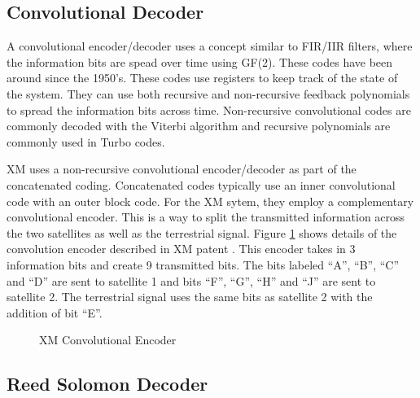 \documentclass[conference,onecolumn]{IEEEtran}
\begin{document}
\subsection{Convolutional Decoder}

A convolutional encoder/decoder uses a concept similar to FIR/IIR filters, where the information bits are spead over time using GF(2).  These codes have been around since the 1950's.  These codes use registers to keep track of the state of the system.  They can use both recursive and non-recursive feedback polynomials to spread the information bits across time.  Non-recursive convolutional codes are commonly decoded with the Viterbi algorithm and recursive polynomials are commonly used in Turbo codes.

XM uses a non-recursive convolutional encoder/decoder as part of the concatenated coding.  Concatenated codes typically use an inner convolutional code with an outer block code.  For the XM sytem, they employ a complementary convolutional encoder.  This is a way to split the transmitted information across the two satellites as well as the terrestrial signal.  Figure \ref{fig::Viterbi} shows details of the convolution encoder described in XM patent \cite{marko_2012_us8667344b2}.  This encoder takes in 3 information bits and create 9 transmitted bits.  The bits labeled ``A'', ``B'', ``C'' and ``D'' are sent to satellite 1 and bits ``F'', ``G'', ``H'' and ``J'' are sent to satellite 2.  The terrestrial signal uses the same bits as satellite 2 with the addition of bit ``E''.

\begin{figure}[H]
	\centerline{}
	\caption{XM Convolutional Encoder \cite{marko_2012_us8667344b2}}
	\label{fig::Viterbi}
\end{figure}

\subsection{Reed Solomon Decoder}
\end{document}
